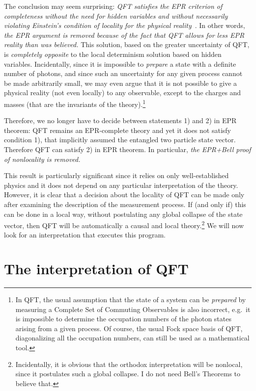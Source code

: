 \documentclass[published]{JHEP3}
\begin{document}
The conclusion may seem surprising: \emph{QFT satisfies the EPR
criterion of completeness without the need for hidden variables and
without necessarily violating Einstein's condition of locality for the
physical reality}~\cite{pureprp}. In other words, \emph{the EPR
argument is removed because of the fact that QFT allows for less EPR
reality than was believed.} This solution, based on the greater
uncertainty of QFT, is \emph{completely opposite} to the local
determinism solution based on hidden variables.  Incidentally, since
it is impossible to \emph{prepare} a state with a definite number of
photons, and since such an uncertainty for any given process cannot be
made arbitrarily small, we may even argue that it is not possible to
give a physical reality (not even locally) to any observable, except
to the charges and masses (that are the invariants of the
theory).\footnote{In QFT, the usual assumption that the state of a
system can be \emph{prepared} by measuring a Complete Set of Commuting
Observables is also incorrect, e.g.\ it is impossible to determine the
occupation numbers of the photon states arising from a given
process. Of course, the usual Fock space basis of QFT, diagonalizing
all the occupation numbers, can still be used as a mathematical tool.}

Therefore, we no longer have to decide between statements 1) and 2) in
EPR theorem: QFT remains an EPR-complete theory and yet it does not
satisfy condition 1), that implicitly assumed the entangled two
particle state vector. Therefore QFT can satisfy 2) in EPR theorem. In
particular, \emph{the EPR+Bell proof of nonlocality is removed.}

This result is particularly significant since it relies on only
well-established physics and it does not depend on any particular
interpretation of the theory. However, it is clear that a decision
about the locality of QFT can be made only after examining the
description of the measurement process. If (and only if) this can be
done in a local way, without postulating any global collapse of the
state vector, then QFT will be automatically a causal and local
theory.\footnote{Incidentally, it is obvious that the orthodox
interpretation will be nonlocal, since it postulates such a global
collapse. I do not need Bell's Theorems to believe that.} We will now
look for an interpretation that executes this program.


\section{The interpretation of QFT}
\end{document}
